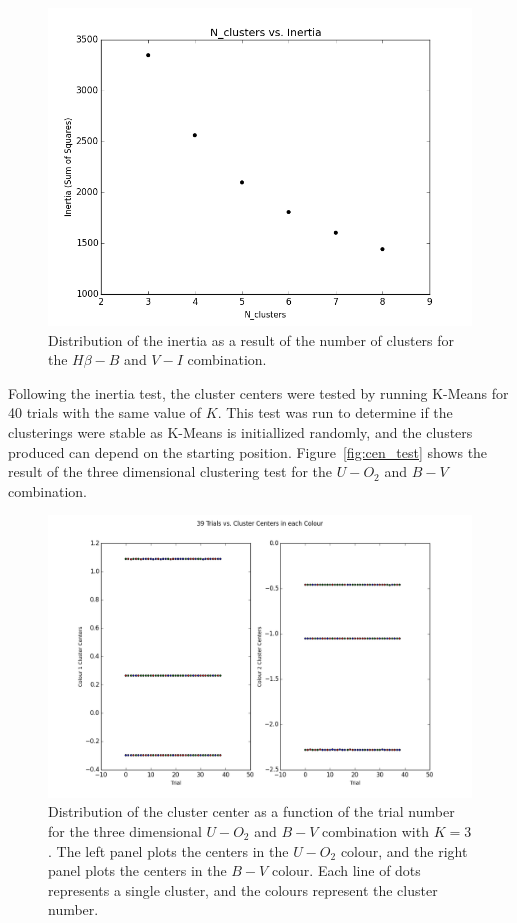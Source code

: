 \begin{figure}[H]
\centering
\includegraphics[width=\linewidth]{figs/methods/inertia_plot}
\caption{Distribution of the inertia as a result of the number of clusters for the $H\beta - B$ and $V - I$ combination.}
\label{fig:inertia}
\end{figure}

Following the inertia test, the cluster centers were tested by running K-Means for 40 trials with the same value of $K$.
This test was run to determine if the clusterings were stable as K-Means is initiallized randomly, and the clusters produced can depend on the starting position.
Figure~\ref{fig:cen_test} shows the result of the three dimensional clustering test for the $U - O_{2}$ and $B - V$ combination.

\begin{figure}[H]
\centering
\includegraphics[width=\linewidth]{figs/methods/3_cl_cluster_centers}
\caption{Distribution of the cluster center as a function of the trial number for the three dimensional $U - O_{2}$ and $B - V$ combination with $K=3$. The left panel plots the centers in the $U - O_{2}$ colour, and the right panel plots the centers in the $B - V$ colour. Each line of dots represents a single cluster, and the colours represent the cluster number.}
\label{fig:inertia}
\end{figure}

